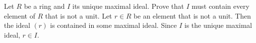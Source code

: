 \documentclass[avery5371,grid]{flashcards}
\begin{document}
% 
% 
% 
% 
\begin{flashcard}[Rings]{Let $R$ be a ring and $I$ its unique maximal ideal. Prove that $I$ must contain every element of $R$ that is not a unit.}
 Let $r \in R$ be an element that is not a unit. Then the ideal $(r)$ is contained in some maximal ideal. Since $I$ is the unique maximal ideal, $r \in I$.
\end{flashcard}
% 
% 
% 
% 
% 
% 
% 
% 
% 
% 
% 
% 
% 
% 
% 
\end{document}
